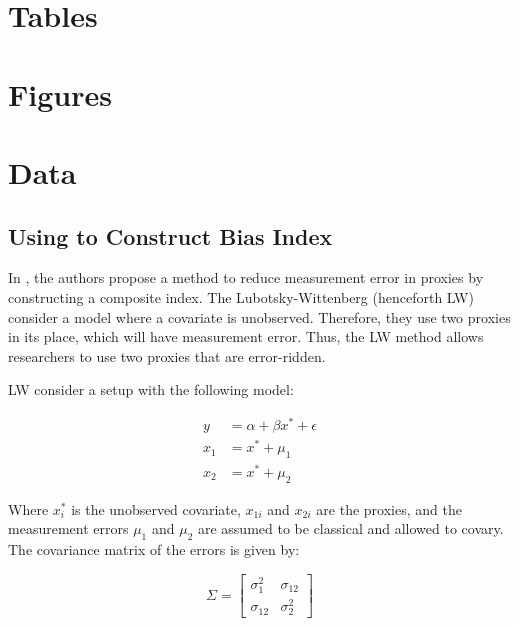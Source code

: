 \documentclass[12pt,english]{article}
\begin{document}
\begin{appendices}

\section{Tables}\label{appendix:tabs}

% 

\section{Figures}\label{appendix:figs}



\section{Data} %
\label{sec:data-ap}

\subsection{Using \textcite{lubotskyInterpretationRegressionsMultiple2006} to Construct Bias Index} %
\label{sub:lw-bias}

In \textcite{lubotskyInterpretationRegressionsMultiple2006}, the authors propose a method to reduce measurement error in proxies by constructing a composite index. The Lubotsky-Wittenberg (henceforth LW) consider a model where a covariate is unobserved. Therefore, they use two proxies in its place, which will have measurement error. Thus, the LW method allows researchers to use two proxies that are error-ridden. 

LW consider a setup with the following model:

\begin{align*}
    y &= \alpha + \beta x^* + \epsilon \\
    x_1 &= x^* + \mu_1 \\
    x_2 &= x^* + \mu_2
\end{align*}

Where \(x_{i}^{*}\) is the unobserved covariate, \(x_{1i}\) and \(x_{2i}\) are the proxies, and the measurement errors \(\mu_1\) and \(\mu_2\) are assumed to be classical and allowed to covary. The covariance matrix of the errors is given by:

\[
\Sigma = \begin{bmatrix}
    \sigma_1^2 & \sigma_{12} \\
    \sigma_{12} & \sigma_2^2
\end{bmatrix}
\]


\end{appendices}
\end{document}
